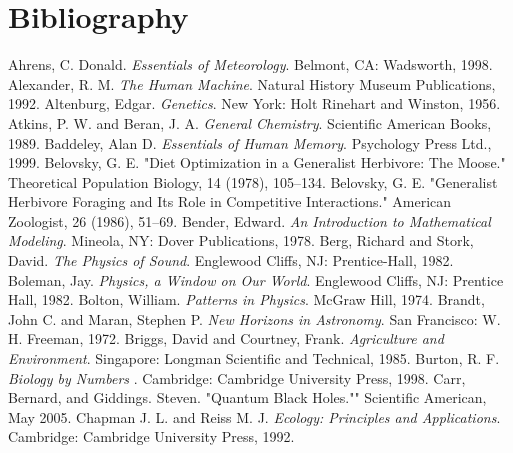 \documentclass[10pt,]{book}
\theoremstyle{plain}
\theoremstyle{definition}
\theoremstyle{definition}
\theoremstyle{definition}
\numberwithin{equation}{part}
\begin{document}
\chapter[{Bibliography}]{Bibliography}\label{bibliography}
\begin{referencelist}
\hypertarget{biblio-1}{}Ahrens, C. Donald. \textit{Essentials of Meteorology}. Belmont, CA: Wadsworth, 1998.
\hypertarget{biblio-2}{}Alexander, R. M. \textit{The Human Machine}. Natural History Museum Publications, 1992.
\hypertarget{biblio-3}{}Altenburg, Edgar. \textit{Genetics}. New York: Holt Rinehart and Winston, 1956.
\hypertarget{biblio-4}{}Atkins, P. W. and Beran, J. A. \textit{General Chemistry}. Scientific American Books, 1989.
\hypertarget{biblio-5}{}Baddeley, Alan D. \textit{Essentials of Human Memory}. Psychology Press Ltd., 1999.
\hypertarget{biblio-6}{}Belovsky, G. E. "Diet Optimization in a Generalist Herbivore: The Moose." Theoretical Population Biology, 14 (1978), 105–134.
\hypertarget{biblio-7}{}Belovsky, G. E. "Generalist Herbivore Foraging and Its Role in Competitive Interactions." American Zoologist, 26 (1986), 51–69.
\hypertarget{biblio-8}{}Bender, Edward. \textit{An Introduction to Mathematical Modeling}. Mineola, NY: Dover Publications, 1978.
\hypertarget{biblio-9}{}Berg, Richard and Stork, David. \textit{The Physics of Sound}. Englewood Cliffs, NJ: Prentice-Hall, 1982.
\hypertarget{biblio-10}{}Boleman, Jay. \textit{Physics, a Window on Our World}. Englewood Cliffs, NJ: Prentice Hall, 1982.
\hypertarget{biblio-11}{}Bolton, William. \textit{Patterns in Physics}. McGraw Hill, 1974.
\hypertarget{biblio-12}{}Brandt, John C. and Maran, Stephen P. \textit{New Horizons in Astronomy}. San Francisco: W. H. Freeman, 1972.
\hypertarget{biblio-13}{}Briggs, David and Courtney, Frank. \textit{Agriculture and Environment}. Singapore: Longman Scientific and Technical, 1985.
\hypertarget{biblio-14}{}Burton, R. F. \textit{Biology by Numbers} . Cambridge: Cambridge University Press, 1998.
\hypertarget{biblio-15}{}Carr, Bernard, and Giddings. Steven. "Quantum Black Holes."" Scientific American, May 2005.
\hypertarget{biblio-16}{}Chapman J. L. and Reiss M. J. \textit{Ecology: Principles and Applications}. Cambridge: Cambridge University Press, 1992.

\end{referencelist}
\end{document}
